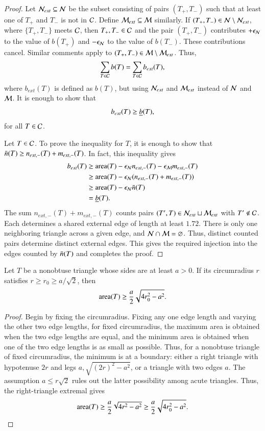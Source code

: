 \begin{proof}
  Let $\mathcal N_{ext}\subseteq \mathcal N$ be the subset consisting of pairs
  $(T_+,T_-)$ such that at least one of $T_+$ and $T_-$ is not in
  $\mathcal C$.  Define $\mathcal M_{ext}\subseteq \mathcal M$ similarly.  If $(T_+,T_-)\in\mathcal N\setminus\mathcal N_{ext}$,
  where $\{T_+,T_-\}$ meets $\mathcal C$, then $T_+,T_-\in\mathcal C$ and the pair $(T_+,T_-)$
  contributes $+\epsilon_{\mathcal N}$ to the value of $b(T_+)$ and $-\epsilon_{\mathcal N}$ to the
  value of $b(T_-)$.  These contributions cancel.  Similar comments
  apply to $(T_+,T_-)\in\mathcal M\setminus \mathcal M_{ext}$.  Thus,
\[
\sum_{T\in \mathcal C} b(T) = \sum_{T\in \mathcal C} b_{ext}(T),
\]
where $b_{ext}(T)$ is defined as $b(T)$, but using $\mathcal N_{ext}$ and
$\mathcal M_{ext}$ instead of $\mathcal N$ and $\mathcal M$. It is enough to show that
\[
b_{ext}(T) \ge \underline{b}(T),
\]
for all $T\in\mathcal C$.

Let $T\in\mathcal C$.  To prove the inequality for $T$, it is enough to show
that $\bar n(T)\ge n_{ext,-}(T)+m_{ext,-}(T)$.  In fact, this inequality gives
\begin{align*}
b_{ext}(T) &\ge {\operatorname{area}}(T) - \epsilon_{\mathcal N} n_{ext,-}(T) - \epsilon_{\mathcal M} m_{ext,-}(T) \\
&\ge {\operatorname{area}}(T) - \epsilon_{\mathcal N} (n_{ext,-}(T)+m_{ext,-}(T)) \\
&\ge {\operatorname{area}}(T) - \epsilon_{\mathcal N} \bar n(T)\\
&= \underline{b}(T).
\end{align*}
The sum $n_{ext,-}(T)+m_{ext,-}(T)$ counts pairs
$(T',T)\in\mathcal N_{ext}\sqcup\mathcal M_{ext}$ with $T'\notin\mathcal C$.
Each determines a shared external edge of length at least $1.72$.
There is only one neighboring triangle across a given edge, and
$\mathcal N\cap\mathcal M=\varnothing$.  Thus, distinct counted pairs determine
distinct external edges.  This gives the required injection into
the edges counted by $\bar n(T)$ and completes the proof.
\end{proof}

\begin{lemma}
  Let $T$ be a nonobtuse triangle whose sides are at least $a>0$.
  If its circumradius $r$ satisfies $r\ge r_0\ge a/\sqrt2$, then
  \[
  {\operatorname{area}}(T)\ge\frac {a}2\sqrt{4r_0^2-a^2}.
  \]
\end{lemma}

\begin{proof} Begin by fixing the circumradius.  Fixing any one
  edge length and varying the other two edge lengths, for fixed circumradius, the maximum
  area is obtained when the two edge lengths are equal, and the
  minimum area is obtained when one of the two edge lengths is as
  small as possible.  Thus, for a nonobtuse triangle of fixed circumradius,
  the minimum is at a boundary: either a right triangle with hypotenuse $2r$
  and legs $a,\sqrt{(2r)^2-a^2}$, or a triangle with two edges $a$.
  The assumption $a\le r\sqrt2$ rules out the latter possibility among
  acute triangles.  Thus, the right-triangle extremal gives
     \[
   {\operatorname{area}}(T)\ge\frac {a}2\sqrt{4r^2-a^2}
   \ge\frac {a}2\sqrt{4r_0^2-a^2}.
   \]
\end{proof}

